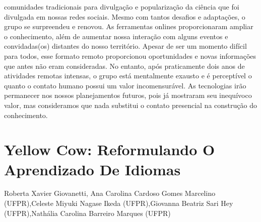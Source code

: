 comunidades tradicionais para divulgação e popularização da ciência que foi divulgada em
nossas redes sociais.
Mesmo com tantos desafios e adaptações, o grupo se surpreendeu e renovou. As
ferramentas onlines proporcionaram ampliar o conhecimento, além de aumentar nossa interação
com alguns eventos e convidadas(os) distantes do nosso território. Apesar de ser um momento
difícil para todos, esse formato remoto proporcionou oportunidades e novas informações que
antes não eram consideradas. No entanto, após praticamente dois anos de atividades remotas
intensas, o grupo está mentalmente exausto e é perceptível o quanto o contato humano possui um
valor incomensurável. As tecnologias irão permanecer nos nossos planejamentos futuros, pois já
mostraram seu inequívoco valor, mas consideramos que nada substitui o contato presencial na
construção do conhecimento.




\section*{Yellow Cow: Reformulando O Aprendizado De Idiomas}

Roberta Xavier Giovanetti, Ana Carolina Cardoso Gomes Marcelino (UFPR),Celeste Miyuki Nagase Ikeda (UFPR),Giovanna Beatriz Sari Hey (UFPR),Nathália Carolina Barreiro Marques (UFPR)

